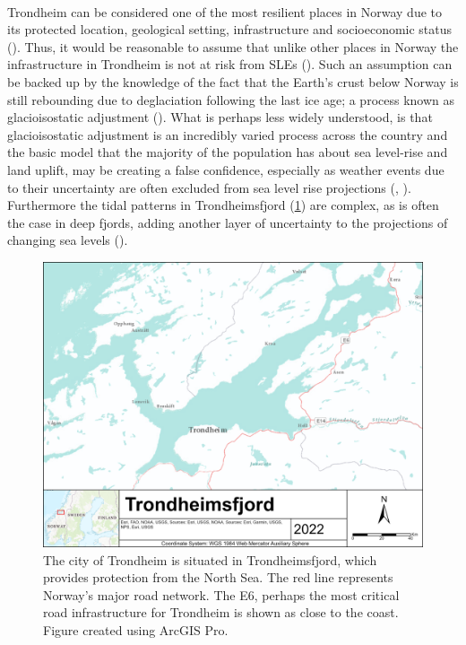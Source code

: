 \paragraph{}
Trondheim can be considered one of the most resilient places in Norway due to its protected location, geological setting, infrastructure and socioeconomic status (\cite{opach_seeking_2020}). Thus, it would be reasonable to assume that unlike other places in Norway the infrastructure in Trondheim is not at risk from SLEs (\cite{baisotti_farevarsel_2020}). Such an assumption can be backed up by the knowledge of the fact that the Earth's crust below Norway is still rebounding due to deglaciation following the last ice age; a process known as glacioisostatic adjustment (\cite{breili_high-accuracy_2020}). What is perhaps less widely understood, is that glacioisostatic adjustment is an incredibly varied process across the country and the basic model that the majority of the population has about sea level-rise and land uplift, may be creating a false confidence, especially as weather events due to their uncertainty are often excluded from sea level rise projections  (\cite{breili_high-accuracy_2020}, \cite{hanssen-bauer_climate_2017}).  Furthermore the tidal patterns in Trondheimsfjord (\ref{fig:research_area}) are complex, as is often the case in deep fjords, adding another layer of uncertainty to the projections of changing sea levels (\cite{hanssen-bauer_climate_2017}).

\begin{figure}[H]
    \centering
    \includegraphics[width=1.0\textwidth]{fig/Trondheimsfjord.png}
    \caption[Research area - Trondheimsfjord]
    {The city of Trondheim is situated in Trondheimsfjord, which provides protection from the North Sea. The red line represents Norway's major road network. The E6, perhaps the most critical road infrastructure for Trondheim is shown as close to the coast. Figure created using ArcGIS Pro. }
    \label{fig:research_area}
    
\end{figure}



